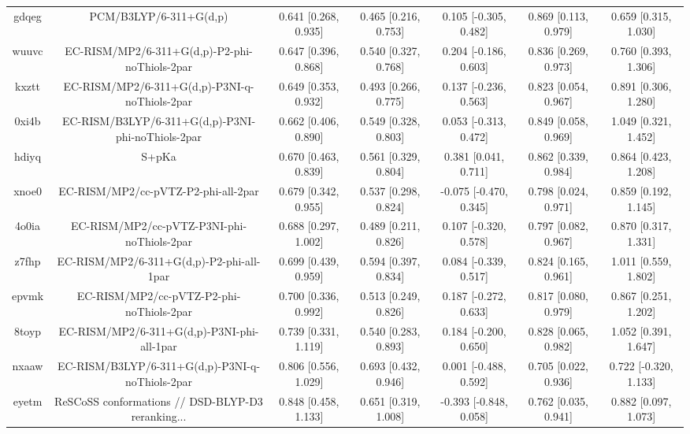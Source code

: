 \documentclass{article}
\begin{document}
\begin{center}
\begin{longtable}{|ccccccc|}
 gdqeg &                             PCM/B3LYP/6-311+G(d,p) &  0.641 [0.268, 0.935] &  0.465 [0.216, 0.753] &    0.105 [-0.305, 0.482] &  0.869 [0.113, 0.979] &   0.659 [0.315, 1.030] \\
 wuuvc &      EC-RISM/MP2/6-311+G(d,p)-P2-phi-noThiols-2par &  0.647 [0.396, 0.868] &  0.540 [0.327, 0.768] &    0.204 [-0.186, 0.603] &  0.836 [0.269, 0.973] &   0.760 [0.393, 1.306] \\
 kxztt &      EC-RISM/MP2/6-311+G(d,p)-P3NI-q-noThiols-2par &  0.649 [0.353, 0.932] &  0.493 [0.266, 0.775] &    0.137 [-0.236, 0.563] &  0.823 [0.054, 0.967] &   0.891 [0.306, 1.280] \\
 0xi4b &  EC-RISM/B3LYP/6-311+G(d,p)-P3NI-phi-noThiols-2par &  0.662 [0.406, 0.890] &  0.549 [0.328, 0.803] &    0.053 [-0.313, 0.472] &  0.849 [0.058, 0.969] &   1.049 [0.321, 1.452] \\
 hdiyq &                                              S+pKa &  0.670 [0.463, 0.839] &  0.561 [0.329, 0.804] &     0.381 [0.041, 0.711] &  0.862 [0.339, 0.984] &   0.864 [0.423, 1.208] \\
 xnoe0 &                EC-RISM/MP2/cc-pVTZ-P2-phi-all-2par &  0.679 [0.342, 0.955] &  0.537 [0.298, 0.824] &   -0.075 [-0.470, 0.345] &  0.798 [0.024, 0.971] &   0.859 [0.192, 1.145] \\
 4o0ia &         EC-RISM/MP2/cc-pVTZ-P3NI-phi-noThiols-2par &  0.688 [0.297, 1.002] &  0.489 [0.211, 0.826] &    0.107 [-0.320, 0.578] &  0.797 [0.082, 0.967] &   0.870 [0.317, 1.331] \\
 z7fhp &           EC-RISM/MP2/6-311+G(d,p)-P2-phi-all-1par &  0.699 [0.439, 0.959] &  0.594 [0.397, 0.834] &    0.084 [-0.339, 0.517] &  0.824 [0.165, 0.961] &   1.011 [0.559, 1.802] \\
 epvmk &           EC-RISM/MP2/cc-pVTZ-P2-phi-noThiols-2par &  0.700 [0.336, 0.992] &  0.513 [0.249, 0.826] &    0.187 [-0.272, 0.633] &  0.817 [0.080, 0.979] &   0.867 [0.251, 1.202] \\
 8toyp &         EC-RISM/MP2/6-311+G(d,p)-P3NI-phi-all-1par &  0.739 [0.331, 1.119] &  0.540 [0.283, 0.893] &    0.184 [-0.200, 0.650] &  0.828 [0.065, 0.982] &   1.052 [0.391, 1.647] \\
 nxaaw &    EC-RISM/B3LYP/6-311+G(d,p)-P3NI-q-noThiols-2par &  0.806 [0.556, 1.029] &  0.693 [0.432, 0.946] &    0.001 [-0.488, 0.592] &  0.705 [0.022, 0.936] &  0.722 [-0.320, 1.133] \\
 eyetm &  ReSCoSS conformations // DSD-BLYP-D3 reranking... &  0.848 [0.458, 1.133] &  0.651 [0.319, 1.008] &   -0.393 [-0.848, 0.058] &  0.762 [0.035, 0.941] &   0.882 [0.097, 1.073] \\

\end{longtable}
\end{center}
\end{document}
